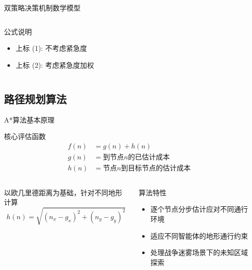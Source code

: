 \documentclass[
10pt,
aspectratio=169,
]{beamer}
\begin{document}
\begin{frame}{双策略决策机制数学模型}
\begin{columns}[T]
\begin{column}{0.48\textwidth}
            
            \begin{block}{公式说明}
                \begin{itemize}
                    \item 上标 (1): 不考虑紧急度
                    \item 上标 (2): 考虑紧急度加权

                \end{itemize}
            \end{block}
        \end{column}
    \end{columns}
    
    
\end{frame}



\subsection{路径规划算法}
\begin{frame}{A*算法基本原理}
    \begin{alertblock}{核心评估函数}
        \begin{align}
            f(n) &= g(n) + h(n) \\
            g(n) &= \text{到节点}n\text{的已估计成本} \\
            h(n) &= \text{节点}n\text{到目标节点的估计成本}
        \end{align}
    \end{alertblock}
    
    \begin{columns}
        \begin{column}{0.5\textwidth}
            \begin{exampleblock}{以欧几里德距离为基础，针对不同地形计算}
                \begin{equation}
                    h(n) = \sqrt{(n_x - g_x)^2 + (n_y - g_y)^2}
                \end{equation}
                
                
            \end{exampleblock}
        \end{column}
        \begin{column}{0.5\textwidth}
            \begin{alertblock}{算法特性}
                \begin{itemize}
                    \item 逐个节点分步估计应对不同通行环境
\item 适应不同智能体的地形通行约束 
\item 处理战争迷雾场景下的未知区域探索
                \end{itemize}
            \end{alertblock}
        \end{column}
    \end{columns}
\end{frame}
\end{document}
